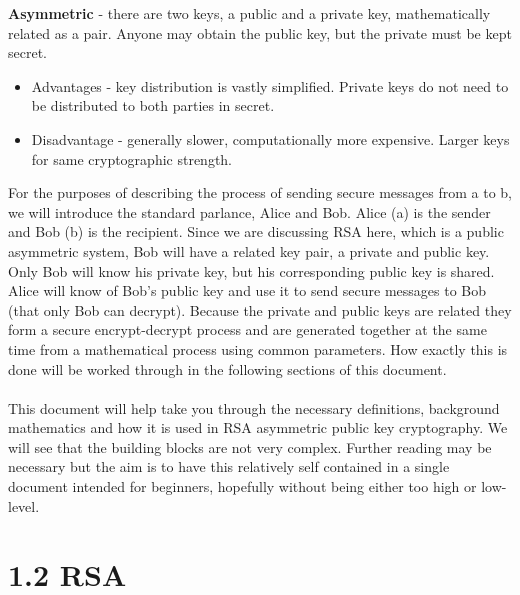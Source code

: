 \documentclass[11pt]{article}   	%
\begin{document}
\textbf{Asymmetric} - there are two keys, a public and a private key, mathematically related as a pair. Anyone may obtain the public key, but the private must be kept secret.
\begin{itemize}
 \item Advantages - key distribution is vastly simplified. Private keys do not need to be distributed to both parties in secret.
 \item Disadvantage - generally slower, computationally more expensive. Larger keys for same cryptographic strength.
\end{itemize}

For the purposes of describing the process of sending secure messages from a to b, we will introduce the standard parlance, Alice and Bob. Alice (a) is the sender and Bob (b) is the recipient. Since we are discussing RSA here, which is a public asymmetric system, Bob will have a related key pair, a private and public key. Only Bob will know his private key, but his corresponding public key is shared. Alice will know of Bob's public key and use it to send secure messages to Bob (that only Bob can decrypt). Because the private and public keys are related they form a secure encrypt-decrypt process and are generated together at the same time from a mathematical process using common parameters. How exactly this is done will be worked through in the following sections of this document. \\
\\
This document will help take you through the necessary definitions, background mathematics and how it is used in RSA asymmetric public key cryptography. We will see that the building blocks are not very complex. Further reading may be necessary but the aim is to have this relatively self contained in a single document intended for beginners, hopefully without being either too high or low-level.


\section*{1.2 RSA}
\end{document}
